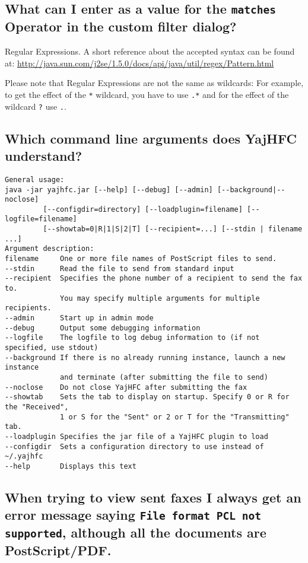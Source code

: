 \documentclass[a4paper,10pt]{scrartcl}
\begin{document}
\subsection{What can I enter as a value for the \texttt{matches} Operator in the custom filter dialog?}

Regular Expressions. A short reference about the accepted syntax can be found at:
\url{http://java.sun.com/j2se/1.5.0/docs/api/java/util/regex/Pattern.html}

Please note that Regular Expressions are not the same as wildcards: 
For example, to get the effect of the \verb.*. wildcard, you have to use \verb#.*# and 
for the effect of the wildcard \verb#?# use \verb#.#.

\subsection{Which command line arguments does YajHFC understand?}

\begin{verbatim}
General usage:
java -jar yajhfc.jar [--help] [--debug] [--admin] [--background|--noclose]
         [--configdir=directory] [--loadplugin=filename] [--logfile=filename]
         [--showtab=0|R|1|S|2|T] [--recipient=...] [--stdin | filename ...]
Argument description:
filename     One or more file names of PostScript files to send.
--stdin      Read the file to send from standard input
--recipient  Specifies the phone number of a recipient to send the fax to.
             You may specify multiple arguments for multiple recipients.
--admin      Start up in admin mode
--debug      Output some debugging information
--logfile    The logfile to log debug information to (if not specified, use stdout)
--background If there is no already running instance, launch a new instance
             and terminate (after submitting the file to send)
--noclose    Do not close YajHFC after submitting the fax
--showtab    Sets the tab to display on startup. Specify 0 or R for the "Received",
             1 or S for the "Sent" or 2 or T for the "Transmitting" tab.
--loadplugin Specifies the jar file of a YajHFC plugin to load
--configdir  Sets a configuration directory to use instead of ~/.yajhfc
--help       Displays this text
\end{verbatim}


\subsection{When trying to view sent faxes I always get an error message saying 
   \texttt{File format PCL not supported}, although all the documents are PostScript/PDF.}
\end{document}
